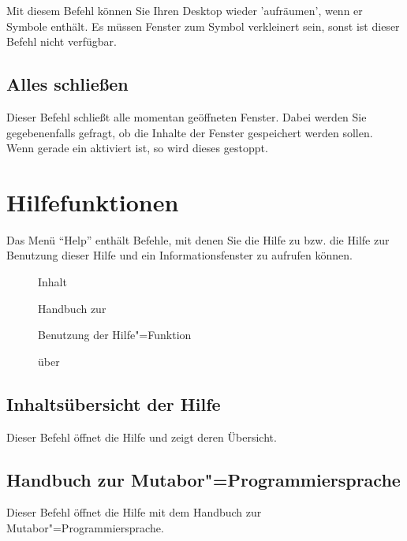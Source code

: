Mit diesem Befehl können Sie Ihren Desktop wieder 'aufräumen', 
wenn er Symbole enthält. Es müssen Fenster zum Symbol verkleinert 
sein, sonst ist dieser Befehl nicht verfügbar.


\subsection{Alles schließen}
\label{sec:MI_CLOSEALL}


Dieser Befehl schließt alle momentan geöffneten Fenster. 
Dabei werden Sie gegebenenfalls gefragt, ob die Inhalte der Fenster 
gespeichert werden sollen. Wenn gerade ein  
aktiviert ist, so wird dieses gestoppt.



\section{Hilfefunktionen}\label{sec:MS_HELP}
Das Menü "`Help"' enthält Befehle, mit denen Sie die Hilfe zu
\mutabor{} bzw. die Hilfe zur Benutzung dieser Hilfe und ein
Informationsfenster zu  \mutabor{} aufrufen
können.


\begin{description}
\item[] Inhalt
\item[] Handbuch zur
\item[] Benutzung der Hilfe"=Funktion
\item[] über \mutabor{}
\end{description}

\subsection{Inhaltsübersicht der Hilfe}
\label{sec:MI_HELPINDEX}

Dieser Befehl öffnet die Hilfe und zeigt deren Übersicht.

\subsection{Handbuch zur Mutabor"=Programmiersprache}
\label{sec:MI_HELPHANDBOOK}

Dieser Befehl öffnet die Hilfe mit dem Handbuch zur
Mutabor"=Programmiersprache.


